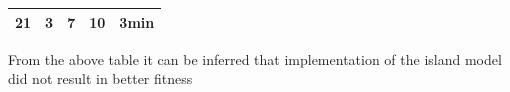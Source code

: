 \documentclass[]{article}
\begin{document}
\begin{longtable}[c]{@{}lllll@{}}
\begin{minipage}[t]{0.17\columnwidth}\raggedright\strut
21
\strut\end{minipage} &
\begin{minipage}[t]{0.17\columnwidth}\raggedright\strut
3
\strut\end{minipage} &
\begin{minipage}[t]{0.17\columnwidth}\raggedright\strut
7
\strut\end{minipage} &
\begin{minipage}[t]{0.17\columnwidth}\raggedright\strut
10
\strut\end{minipage} &
\begin{minipage}[t]{0.17\columnwidth}\raggedright\strut
3min
\strut\end{minipage}\tabularnewline
\bottomrule
\end{longtable}

From the above table it can be inferred that implementation of the
island model did not result in better fitness
\end{document}
